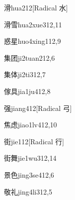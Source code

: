 \begin{verbete}{滑}{hua2}{12}[Radical 水]
\end{verbete}

\begin{verbete}{滑雪}{hua2xue3}{12,11}
\end{verbete}

\begin{verbete}{惑星}{huo4xing1}{12,9}
\end{verbete}

\begin{verbete}{集团}{ji2tuan2}{12,6}
\end{verbete}

\begin{verbete}{集体}{ji2ti3}{12,7}
\end{verbete}

\begin{verbete}{傢具}{jia1ju4}{12,8}
\end{verbete}

\begin{verbete}{强}{jiang4}{12}[Radical 弓]
\end{verbete}

\begin{verbete}{焦虑}{jiao1lv4}{12,10}
\end{verbete}

\begin{verbete}{街}{jie1}{12}[Radical 行]
\end{verbete}

\begin{verbete}{街舞}{jie1wu3}{12,14}
\end{verbete}

\begin{verbete}{景色}{jing3se4}{12,6}
\end{verbete}

\begin{verbete}{敬礼}{jing4li3}{12,5}
\end{verbete}

